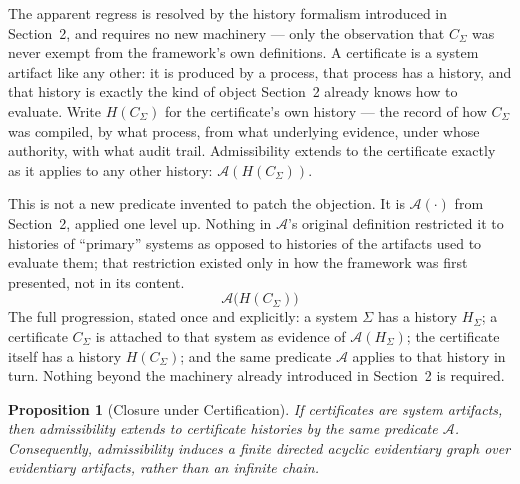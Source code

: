 \documentclass[11pt]{article}
\newtheorem{proposition}{Proposition}
\begin{document}
The apparent regress is resolved by the history formalism introduced in Section~2, and requires no new machinery --- only the observation that $C_\Sigma$ was never exempt from the framework's own definitions. A certificate is a system artifact like any other: it is produced by a process, that process has a history, and that history is exactly the kind of object Section~2 already knows how to evaluate. Write $H(C_\Sigma)$ for the certificate's own history --- the record of how $C_\Sigma$ was compiled, by what process, from what underlying evidence, under whose authority, with what audit trail. Admissibility extends to the certificate exactly as it applies to any other history: $\mathcal{A}(H(C_\Sigma))$.

This is not a new predicate invented to patch the objection. It is $\mathcal{A}(\cdot)$ from Section~2, applied one level up. Nothing in $\mathcal{A}$'s original definition restricted it to histories of ``primary'' systems as opposed to histories of the artifacts used to evaluate them; that restriction existed only in how the framework was first presented, not in its content.
\begin{equation}
\mathcal{A}\big(H(C_\Sigma)\big)
\end{equation}
The full progression, stated once and explicitly: a system $\Sigma$ has a history $H_\Sigma$; a certificate $C_\Sigma$ is attached to that system as evidence of $\mathcal{A}(H_\Sigma)$; the certificate itself has a history $H(C_\Sigma)$; and the same predicate $\mathcal{A}$ applies to that history in turn. Nothing beyond the machinery already introduced in Section~2 is required.

\begin{proposition}[Closure under Certification]
If certificates are system artifacts, then admissibility extends to certificate histories by the same predicate $\mathcal{A}$. Consequently, admissibility induces a finite directed acyclic evidentiary graph over evidentiary artifacts, rather than an infinite chain.
\end{proposition}
\end{document}
